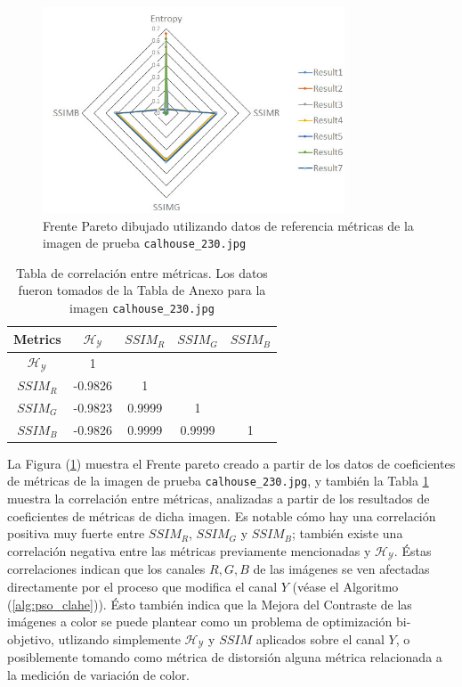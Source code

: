 \begin{figure}[H]
    \centering
        \includegraphics[width=0.80\textwidth]{./Figures/pareto_front.jpg}
    \caption{Frente Pareto dibujado utilizando datos de referencia métricas de la imagen de prueba \texttt{calhouse\_230.jpg} }\label{fig:pareto_front}
\end{figure}

\begin{table}[H]
\setlength{\abovecaptionskip}{2pt plus 3pt minus 2pt} %
\caption[Parámetros de entrada para $MOPSO$]{Tabla de correlación entre métricas. Los datos fueron tomados de la Tabla de Anexo para la imagen \texttt{calhouse\_230.jpg}}
\begin{center}
 \begin{tabular}{||c | c c c c||} 
 \hline
Metrics & $\mathscr{H_Y}$ & $SSIM_R$ & $SSIM_G$ & $SSIM_B$ \\ 
\hline
$\mathscr{H_Y}$ & 1 &   &   &  \\ 
\hline
$SSIM_R$ & -0.9826  & 1 &  &  \\ 
\hline
$SSIM_G$ & -0.9823 & 0.9999   & 1   &  \\ 
\hline
$SSIM_B$ & -0.9826 & 0.9999   & 0.9999   & 1 \\ 
\hline
\end{tabular}
\end{center}
\label{table:correlacion}
\end{table}

La Figura (\ref{fig:pareto_front}) muestra el Frente pareto creado a partir de los datos de coeficientes de métricas de la imagen de prueba \texttt{calhouse\_230.jpg}, y también la Tabla \ref{table:correlacion} muestra la correlación entre métricas, analizadas a partir de los resultados de coeficientes de métricas de dicha imagen. Es notable cómo hay una correlación positiva muy fuerte entre $SSIM_R$, $SSIM_G$ y $SSIM_B$; también existe una correlación negativa entre las métricas previamente mencionadas y $\mathscr{H_Y}$. Éstas correlaciones indican que los canales  $R,G,B$ de las imágenes se ven afectadas directamente por el proceso que modifica el canal $Y$ (véase el Algoritmo (\ref{alg:pso_clahe})). Ésto también indica que la Mejora del Contraste de las imágenes a color se puede plantear como un problema de optimización bi-objetivo, utlizando simplemente $\mathscr{H_Y}$ y $SSIM$ aplicados sobre el canal $Y$, o posiblemente tomando como métrica de distorsión alguna métrica relacionada a la medición de variación de color.

